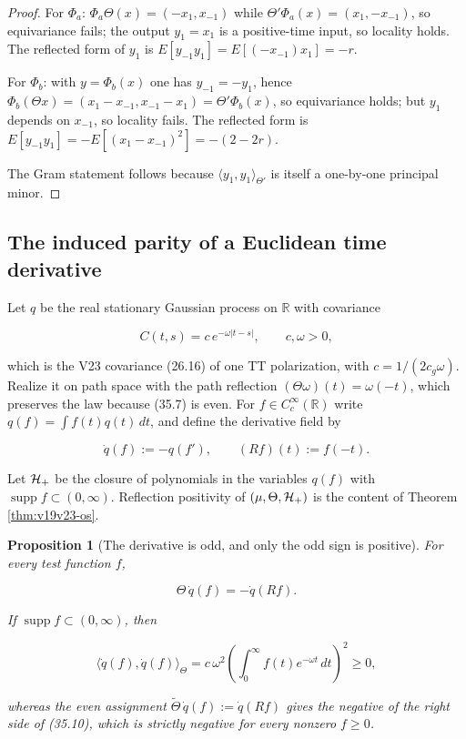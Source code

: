 \documentclass[11pt]{article}
\newtheorem{proposition}[theorem]{Proposition}
\theoremstyle{remark}
\begin{document}
\begin{proof}
For \(\Phi_a\): \(\Phi_a\Theta(x)=(-x_1,x_{-1})\) while
\(\Theta'\Phi_a(x)=(x_1,-x_{-1})\), so equivariance fails; the output
\(y_1=x_1\) is a positive-time input, so locality holds.  The reflected
form of \(y_1\) is \(E[y_{-1}y_1]=E[(-x_{-1})x_1]=-r\).

For \(\Phi_b\): with \(y=\Phi_b(x)\) one has \(y_{-1}=-y_1\), hence
\(\Phi_b(\Theta x)=(x_1-x_{-1},x_{-1}-x_1)=\Theta'\Phi_b(x)\), so
equivariance holds; but \(y_1\) depends on \(x_{-1}\), so locality
fails.  The reflected form is
\(E[y_{-1}y_1]=-E[(x_1-x_{-1})^2]=-(2-2r)\).

The Gram statement follows because \(\langle y_1,y_1\rangle_{\Theta'}\)
is itself a one-by-one principal minor.
\end{proof}

\subsection{The induced parity of a Euclidean time derivative}

Let \(q\) be the real stationary Gaussian process on \(\mathbb R\) with
covariance

\[
 C(t,s)=c\,e^{-\omega|t-s|},\qquad c,\omega>0,                 \tag{35.7}
\]

which is the V23 covariance (26.16) of one TT polarization, with
\(c=1/(2c_g\omega)\).  Realize it on path space with the path reflection
\((\Theta\omega)(t)=\omega(-t)\), which preserves the law because
(35.7) is even.  For \(f\in C_c^\infty(\mathbb R)\) write
\(q(f)=\int f(t)q(t)\,dt\), and define the derivative field by

\[
 \dot q(f):=-q(f'),\qquad (Rf)(t):=f(-t).                       \tag{35.8}
\]

Let \({\cal H}_+\) be the closure of polynomials in the variables
\(q(f)\) with \(\operatorname{supp}f\subset(0,\infty)\).  Reflection
positivity of \((\mu,\Theta,{\cal H}_+)\) is the content of Theorem
\ref{thm:v19v23-os}.

\begin{proposition}[The derivative is odd, and only the odd sign is positive]
\label{prop:v19v32-derivative}
For every test function \(f\),

\[
 \Theta\,\dot q(f)=-\dot q(Rf).                                 \tag{35.9}
\]

If \(\operatorname{supp}f\subset(0,\infty)\), then

\[
 \langle\dot q(f),\dot q(f)\rangle_\Theta
 =c\,\omega^2\left(\int_0^\infty f(t)e^{-\omega t}\,dt\right)^2\geq0,
                                                                    \tag{35.10}
\]

whereas the even assignment
\(\widetilde\Theta\,\dot q(f):=\dot q(Rf)\) gives the negative of the
right side of (35.10), which is strictly negative for every nonzero
\(f\geq0\).
\end{proposition}
\end{document}
